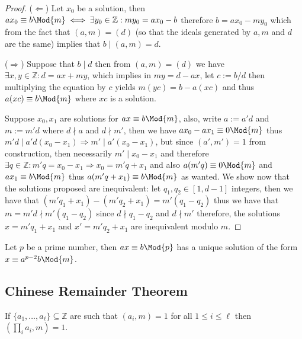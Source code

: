 \begin{proof}
    (\(\Leftarrow\)) Let \(x_0\) be a solution, then \(ax_0 \equiv b \Mod{m} \iff
    \exists y_0 \in \mathbb{Z} : my_0 = ax_0 - b\) therefore \(b = ax_0 -
    my_0\) which from the fact that \((a, m) = (d)\) (so that the ideals
    generated by \(a, m\) and  \(d\) are the same) implies that \(b \mid (a,
    m) = d\).

    (\(\Rightarrow\)) Suppose that \(b \mid d\) then from \((a, m) = (d)\) we
    have \(\exists x, y \in \mathbb{Z} : d = ax + my\), which implies in \(my = d
    - ax\), let \(c := b/d\) then multiplying the equation by \(c\) yields
    \(m(yc) = b - a(xc)\) and thus \(a(xc) \equiv b \Mod{m}\) where \(xc\) is a
    solution.

    Suppose \(x_0, x_1\) are solutions for  \(ax \equiv b \Mod{m}\), also, write
    \(a := a'd\) and  \(m := m'd\) where \(d \nmid a\) and \(d \nmid m'\), then
    we have \(ax_0 - ax_1 \equiv 0 \Mod{m}\) thus \(m'd \mid a'd(x_0 - x_1)
    \Rightarrow m' \mid a'(x_0 - x_1)\), but since \((a', m') = 1\) from
    construction, then necessarily \(m' \mid x_0 - x_1\) and therefore \(\exists
    q \in \mathbb{Z} : m'q = x_0 - x_1 \Rightarrow x_0 = m'q + x_1\) and also
    \(a(m'q) \equiv 0 \Mod{m}\) and  \(ax_1 \equiv b \Mod{m}\) thus \(a(m'q +
    x_1) \equiv b \Mod{m}\) as wanted. We show now that the solutions proposed
    are inequivalent: let \(q_1, q_2 \in [1, d-1]\) integers, then we have that
    \((m'q_1 + x_1) - (m'q_2 + x_1) = m' (q_1 - q_2)\) thus we have that \(m =
    m'd \nmid m'(q_1 - q_2)\) since  \(d \nmid q_1 - q_2\) and \(d \nmid m'\)
    therefore, the solutions \(x = m'q_1 + x_1\) and \(x' = m'q_2 + x_1\) are
    inequivalent modulo \(m\).
\end{proof}

\begin{proposition}
    Let \(p\) be a prime number, then  \(ax \equiv b \Mod{p}\) has a unique
    solution of the form \(x \equiv a^{p-2} b \Mod{m}\).
\end{proposition}

\subsection{Chinese Remainder Theorem}

\begin{lemma}\label{ChiRemLem1}
    If \(\{a_1, \dots, a_\ell\} \subseteq \mathbb{Z}\) are such that \((a_i, m) =
    1\) for all \(1 \leqslant i \leqslant \ell\) then \((\prod_i a_i, m) = 1\).
\end{lemma}


